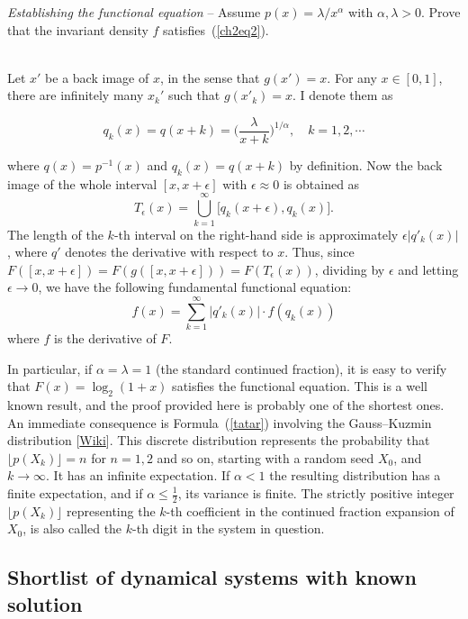 \documentclass[oneside,10pt]{book}
\newcommand{\qed}{\nobreak \ifvmode \relax \else
      \ifdim\lastskip<1.5em \hskip-\lastskip
      \hskip1.5em plus0em minus0.5em \fi \nobreak
      \vrule height0.75em width0.5em depth0.25em\fi}
\begin{document}
\begin{Exercise}\label{exch2ex1} {\em Establishing the functional equation} -- Assume $p(x) = \lambda/x^\alpha$ with $\alpha,\lambda >0$. Prove that the invariant density $f$ satisfies~(\ref{ch2eq2}). \vspace{1ex}

 \\ 
Let $x'$ be a back image of $x$, in the sense that $g(x')=x$. For any $x\in [0,1]$, there are infinitely many  $x_k'$ such that
 $g(x'_k)=x$. I denote them as

$$q_k(x) = q(x+k) = \Big(\frac{\lambda}{x+k}\Big)^{1/\alpha}, \quad k=1,2,\cdots$$

\noindent where $q(x)=p^{-1}(x)$ and $q_k(x)=q(x+k)$ by definition. Now the back image of the whole interval $[x,x+\epsilon]$ with $\epsilon\approx 0$ is obtained as
$$ T_\epsilon(x) = \bigcup_{k=1}^\infty \Big[q_k(x+\epsilon),q_k(x)\Big].$$
The length of the $k$-th interval on the right-hand side is approximately $\epsilon |q'_k(x)|$, where $q'$ denotes the derivative with respect to $x$. Thus, since  $F([x,x+\epsilon]) = F(g([x,x+\epsilon])) = F(T_\epsilon(x))$, dividing by $\epsilon$ and letting $\epsilon\rightarrow 0$, we have the following fundamental functional equation:
$$f(x)=\sum_{k=1}^\infty |q'_k(x)|\cdot f(q_k(x))$$
where $f$ is the derivative of $F$.\qed

In particular, if $\alpha=\lambda=1$ (the standard continued fraction), it is easy to verify that $F(x)=\log_2(1+x)$ satisfies the functional equation. This is a well known result, and the proof provided here is probably one of the shortest ones. An immediate consequence is Formula~(\ref{tatar})
 involving the \textcolor{index}{Gauss–Kuzmin distribution} [\href{https://en.wikipedia.org/wiki/Gauss\%E2\%80\%93Kuzmin_distribution}{Wiki}]. This discrete distribution represents the probability that 
$\lfloor  p(X_k) \rfloor =n$ for $n=1,2$ and so on, starting with a random seed $X_0$, and $k\rightarrow\infty$. It has an infinite expectation. If $\alpha<1$ the resulting distribution has a finite
 expectation, and if $\alpha\leq\frac{1}{2}$, its variance is finite. The strictly positive integer $\lfloor  p(X_k) \rfloor$ representing the $k$-th coefficient in 
 the continued fraction expansion of $X_0$, is also called the $k$-th \textcolor{index}{digit} in the system in question.
\end{Exercise}

\subsection{Shortlist of dynamical systems with known solution}\label{bckdigt}
\end{document}

